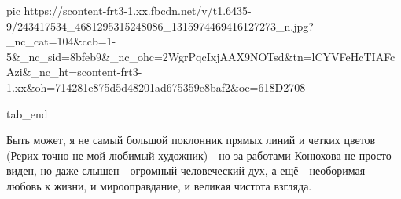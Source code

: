      pic https://scontent-frt3-1.xx.fbcdn.net/v/t1.6435-9/243417534_4681295315248086_1315974469416127273_n.jpg?_nc_cat=104&ccb=1-5&_nc_sid=8bfeb9&_nc_ohc=2WgrPqcIxjAAX9NOTsd&tn=lCYVFeHcTIAFcAzi&_nc_ht=scontent-frt3-1.xx&oh=714281e875d5d48201ad675359e8baf2&oe=618D2708

  tab_end
\fi

Быть может, я не самый большой поклонник прямых линий и
четких цветов (Рерих точно не мой любимый художник) - но за работами Конюхова
не просто виден, но даже слышен - огромный человеческий дух, а ещё - необоримая
любовь к жизни, и мирооправдание, и великая чистота взгляда.


